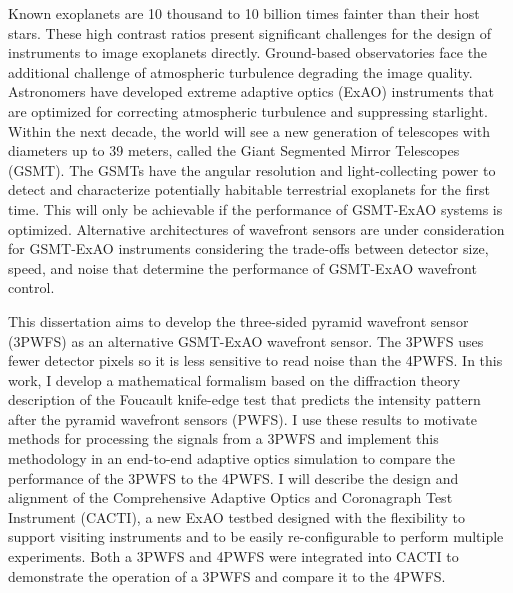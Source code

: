 Known exoplanets are 10 thousand to 10 billion times fainter than their host stars. These high contrast ratios present significant challenges for the design of instruments to image exoplanets directly. Ground-based observatories face the additional challenge of atmospheric turbulence degrading the image quality. Astronomers have developed extreme adaptive optics (ExAO)  instruments that are optimized for correcting atmospheric turbulence and suppressing starlight. Within the next decade, the world will see a new generation of telescopes with diameters up to 39 meters, called the Giant Segmented Mirror Telescopes (GSMT). The GSMTs have the angular resolution and light-collecting power to detect and characterize potentially habitable terrestrial exoplanets for the first time. This will only be achievable if the performance of GSMT-ExAO systems is optimized. Alternative architectures of wavefront sensors are under consideration for GSMT-ExAO instruments considering the trade-offs between detector size, speed, and noise that determine the performance of GSMT-ExAO wavefront control. 

This dissertation aims to develop the three-sided pyramid wavefront sensor (3PWFS) as an alternative GSMT-ExAO wavefront sensor. The 3PWFS  uses fewer detector pixels so it is less sensitive to read noise than the 4PWFS. In this work, I develop a mathematical formalism based on the diffraction theory description of the Foucault knife-edge test that predicts the intensity pattern after the pyramid wavefront sensors (PWFS). I use these results to motivate methods for processing the signals from a 3PWFS and implement this methodology in an end-to-end adaptive optics simulation to compare the performance of the 3PWFS to the 4PWFS. I will describe the design and alignment of the Comprehensive Adaptive Optics and Coronagraph Test Instrument (CACTI), a new ExAO testbed designed with the flexibility to support visiting instruments and to be easily re-configurable to perform multiple experiments. Both a 3PWFS and 4PWFS were integrated into CACTI to demonstrate the operation of a 3PWFS and compare it to the 4PWFS.


